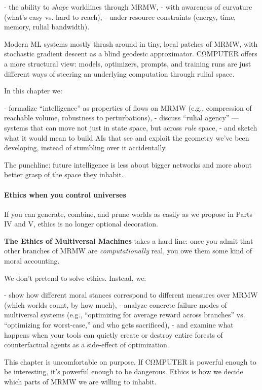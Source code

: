 - the ability to \emph{shape} worldlines through MRMW,
- with awareness of curvature (what’s easy vs. hard to reach),
- under resource constraints (energy, time, memory, rulial bandwidth).

Modern ML systems mostly thrash around in tiny, local patches of MRMW, with stochastic gradient descent as a blind geodesic approximator. CΩMPUTER offers a more structural view: models, optimizers, prompts, and training runs are just different ways of steering an underlying computation through rulial space.

In this chapter we:

- formalize “intelligence” as properties of flows on MRMW (e.g., compression of reachable volume, robustness to perturbations),
- discuss “rulial agency” — systems that can move not just in state space, but across \emph{rule} space,
- and sketch what it would mean to build AIs that see and exploit the geometry we’ve been developing, instead of stumbling over it accidentally.

The punchline: future intelligence is less about bigger networks and more about better grasp of the space they inhabit.

\paragraph{Ethics when you control universes}

If you can generate, combine, and prune worlds as easily as we propose in Parts IV and V, ethics is no longer optional decoration.

\textbf{The Ethics of Multiversal Machines} takes a hard line:  
once you admit that other branches of MRMW are \emph{computationally} real, you owe them some kind of moral accounting.

We don’t pretend to solve ethics. Instead, we:

- show how different moral stances correspond to different measures over MRMW (which worlds count, by how much),
- analyze concrete failure modes of multiversal systems (e.g., “optimizing for average reward across branches” vs. “optimizing for worst-case,” and who gets sacrificed),
- and examine what happens when your tools can quietly create or destroy entire forests of counterfactual agents as a side-effect of optimization.

This chapter is uncomfortable on purpose. If CΩMPUTER is powerful enough to be interesting, it’s powerful enough to be dangerous. Ethics is how we decide which parts of MRMW we are willing to inhabit.

